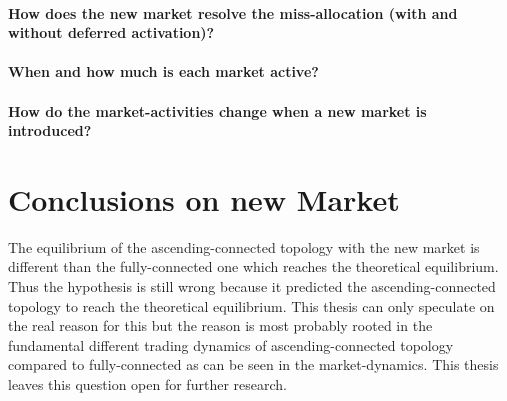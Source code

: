 \documentclass[Bachelorarbeit.tex]{subfiles}
\begin{document}
\paragraph{How does the new market resolve the miss-allocation (with and without deferred activation)?}
\paragraph{When and how much is each market active?}
\paragraph{How do the market-activities change when a new market is introduced?}

\section{Conclusions on new Market}
The equilibrium of the ascending-connected topology with the new market is different than the fully-connected one which reaches the theoretical equilibrium. Thus the hypothesis is still wrong because it predicted the ascending-connected topology to reach the theoretical equilibrium. This thesis can only speculate on the real reason for this but the reason is most probably rooted in the fundamental different trading dynamics of ascending-connected topology compared to fully-connected as can be seen in the market-dynamics. This thesis leaves this question open for further research.
\end{document}
